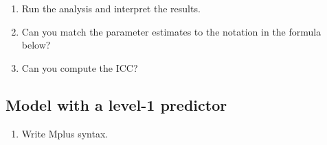 \documentclass[
]{book}
\providecommand{\tightlist}{%
  \setlength{\itemsep}{0pt}\setlength{\parskip}{0pt}}
\begin{document}
\begin{enumerate}
\def\labelenumi{\arabic{enumi}.}
\setcounter{enumi}{1}
\item
  Run the analysis and interpret the results.
\item
  Can you match the parameter estimates to the notation in the formula below?
\item
  Can you compute the ICC?
\end{enumerate}

\hypertarget{model-with-a-level-1-predictor}{%
\subsection{Model with a level-1 predictor}\label{model-with-a-level-1-predictor}}

\begin{enumerate}
\def\labelenumi{\arabic{enumi}.}
\tightlist
\item
  Write Mplus syntax.
\end{enumerate}
\end{document}
